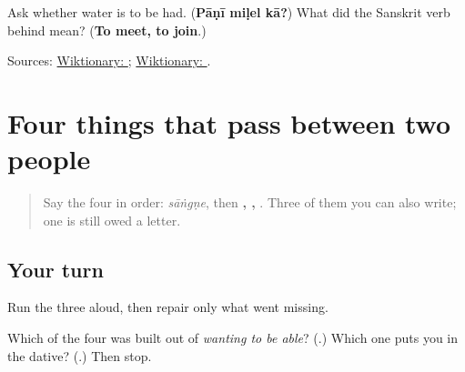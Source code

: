 \begin{tcolorbox}[breakable,colback=teal!4,colframe=teal!35!black,title={Before you move on}]
Ask whether water is to be had. (\textbf{Pāṇī miḷel kā?}) What did the Sanskrit verb behind \textbf{} mean? (\textbf{To meet, to join}.)

Sources: \href{https://en.wiktionary.org/wiki/\%E0\%A4\%AE\%E0\%A4\%BF\%E0\%A4\%B3\%E0\%A4\%A3\%E0\%A5\%87}{Wiktionary: }; \href{https://en.wiktionary.org/wiki/\%E0\%A4\%AE\%E0\%A4\%BF\%E0\%A4\%B2\%E0\%A4\%A4\%E0\%A4\%BF}{Wiktionary: }.
\end{tcolorbox}
\section[\texorpdfstring{\mr{म्हणणे} / \mr{शिकणे} / \mr{मिळणे} (mhaṇṇe / shikṇe …)}{म्हणणे / शिकणे / मिळणे (mhaṇṇe / shikṇe …)}]{Four things that pass between two people}

\label{lesson:MR-R24-passing-verbs}



\begin{quote}
Say the four in order: \emph{sāṅgṇe}, then \textbf{, , }. Three of them you can also write; one is still owed a letter.
\end{quote}

\subsection*{Your turn}
Run the three aloud, then repair only what went missing.

\begin{tcolorbox}[breakable,colback=teal!4,colframe=teal!35!black,title={Before you move on}]
Which of the four was built out of \emph{wanting to be able}? (\textbf{}.) Which one puts you in the dative? (\textbf{}.) Then stop.
\end{tcolorbox}
